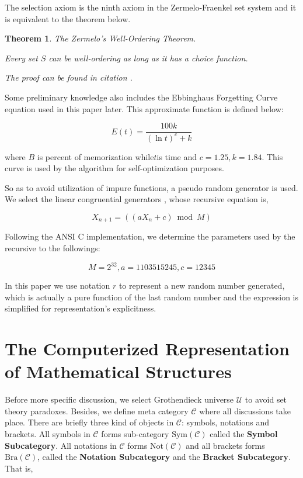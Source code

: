 \documentclass{article}
\newtheorem{theorem}{Theorem}	%
\numberwithin{theorem}{section}	%
\numberwithin{axiom}{section}	%
\numberwithin{definition}{section}	%
\begin{document}
The selection axiom is the ninth axiom in the Zermelo-Fraenkel set system and it is equivalent to the theorem below.

\begin{theorem}
	The Zermelo{'}s Well-Ordering Theorem.\cite{1}
	
	Every set \(S\) can be well-ordering as long as it has a choice function.
	
	The proof can be found in citation \cite{1}.
\end{theorem}

Some preliminary knowledge also includes the Ebbinghaus Forgetting Curve equation \cite{4} used in this paper later. This approximate function is defined below:

\[E(\mathit{t})=\frac{100 k}{(\ln  t)^c+k}\]

\noindent where \(B\) is percent of memorization while\(t\)is time and \(c=1.25,k=1.84\). This curve is used by the algorithm for self-optimization purposes.

So as to avoid utilization of impure functions, a pseudo random generator is used. We select the linear congruential generators \cite{5}, whose recursive equation is,

\[X_{n+1}=(\left(a X_n+c\right) \bmod M)\]

Following the ANSI C implementation, we determine the parameters used by the recursive to the followings:

\[M=2^{32},a=1103515245, c=12345\]

In this paper we use notation \(\mathit{r}\) to represent a new random number generated, which is actually a pure function of the last random number and the expression is simplified for representation{'}s explicitness.

\section{The Computerized Representation of Mathematical Structures}

Before more specific discussion, we select Grothendieck universe \(\mathcal{U}\) \cite{1} to avoid set theory paradoxes. Besides, we define meta category \(\mathcal{C}\) where all discussions take place. There are briefly three kind of objects in \(\mathcal{C}\): symbols, notations and brackets. All symbols in \(\mathcal{C}\) forms sub-category \(\text{Sym}(\mathcal{C})\) called the \textbf{ Symbol Subcategory}. All notations in \(\mathcal{C}\) forms \(\text{Not}(\mathcal{C})\) and all brackets forms \(\text{Bra}(\mathcal{C})\), called the \textbf{ Notation Subcategory} and the \textbf{ Bracket Subcategory}. That is,
\end{document}
